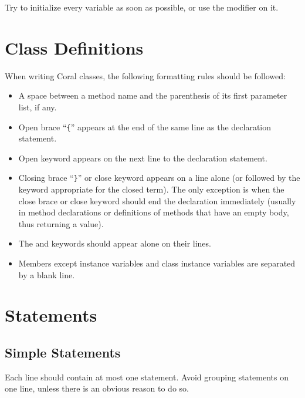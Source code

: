 Try to initialize every variable as soon as possible, or use the  modifier on it. 






\section{Class Definitions}

When writing Coral classes, the following formatting rules should be followed: 
\begin{itemize}
\item A space between a method name and the parenthesis of its first parameter list, if any. 
\item Open brace ``\lstinline!{!'' appears at the end of the same line as the declaration statement. 
\item Open keyword  appears on the next line to the declaration statement. 
\item Closing brace ``\lstinline!}!'' or close keyword  appears on a line alone (or followed by the keyword appropriate for the closed term). The only exception is when the close brace or close keyword should end the declaration immediately (usually in method declarations or definitions of methods that have an empty body, thus returning a  value). 
\item The  and  keywords should appear alone on their lines. 
\item Members except instance variables and class instance variables are separated by a blank line. 
\end{itemize}





\section{Statements}






\subsection{Simple Statements}

Each line should contain at most one statement. Avoid grouping statements on one line, unless there is an obvious reason to do so. 





